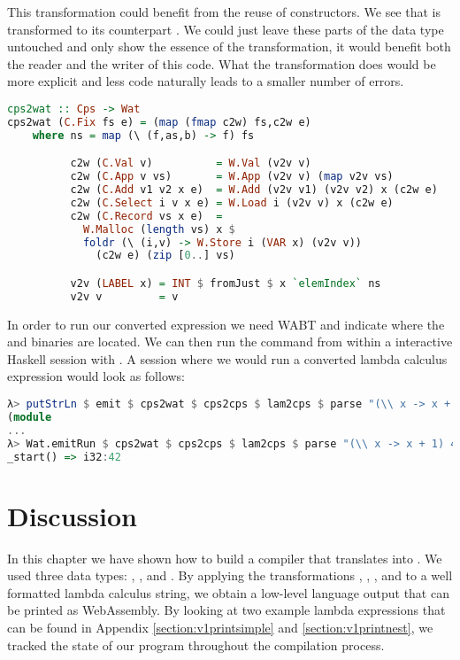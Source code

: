 {This transformation could benefit from the reuse of constructors. We see that  is transformed to its  counterpart . We could just leave these parts of the data type untouched and only show the essence of the transformation, it would benefit both the reader and the writer of this code. What the transformation does would be more explicit and less code naturally leads to a smaller number of errors.

\begin{lstlisting}[language=Haskell]
cps2wat :: Cps -> Wat
cps2wat (C.Fix fs e) = (map (fmap c2w) fs,c2w e)
    where ns = map (\ (f,as,b) -> f) fs

          c2w (C.Val v)          = W.Val (v2v v)
          c2w (C.App v vs)       = W.App (v2v v) (map v2v vs)
          c2w (C.Add v1 v2 x e)  = W.Add (v2v v1) (v2v v2) x (c2w e)
          c2w (C.Select i v x e) = W.Load i (v2v v) x (c2w e)
          c2w (C.Record vs x e)  =
            W.Malloc (length vs) x $
            foldr (\ (i,v) -> W.Store i (VAR x) (v2v v))
              (c2w e) (zip [0..] vs)

          v2v (LABEL x) = INT $ fromJust $ x `elemIndex` ns
          v2v v         = v
\end{lstlisting}

In order to run our converted expression we need WABT and indicate where the  and  binaries are located. We can then run the command from within a interactive Haskell session with . A  session where we would run a converted lambda calculus expression would look as follows:

\begin{lstlisting}[language=Haskell]
λ> putStrLn $ emit $ cps2wat $ cps2cps $ lam2cps $ parse "(\\ x -> x + 1) 41"
(module
...
λ> Wat.emitRun $ cps2wat $ cps2cps $ lam2cps $ parse "(\\ x -> x + 1) 41"
_start() => i32:42
\end{lstlisting}

\section{\label{section:summarycps}Discussion}
In this chapter we have shown how to build a compiler that translates  into . We used three data types: , , and . By applying the transformations , , , and  to a well formatted lambda calculus string, we obtain a low-level language output that can be printed as WebAssembly. By looking at two example lambda expressions that can be found in Appendix \ref{section:v1printsimple} and \ref{section:v1printnest}, we tracked the state of our program throughout the compilation process.

}

